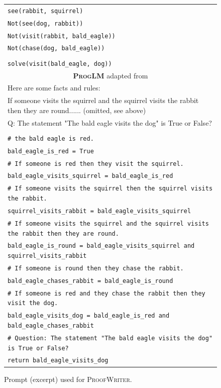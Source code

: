\documentclass{article}
\theoremstyle{definition}
\newcommand{\proofwriter}{\textsc{ProofWriter}}
\newcommand{\pallm}{\textsc{ProgLM}}
\begin{document}
\begin{figure}[h]
\begin{tabularx}{\linewidth}{X}
    \tt see(rabbit, squirrel) \\
    \tt Not(see(dog, rabbit)) \\
    \tt Not(visit(rabbit, bald\_eagle)) \\
    \tt Not(chase(dog, bald\_eagle))\\
\\
    \tt solve(visit(bald\_eagle, dog)) \\
    \midrule
    \multicolumn{1}{c}{\textbf{\pallm{}} adapted from \cite{creswell2023selectioninference}} \\
    \midrule
             Here are some facts and rules:\\
If someone visits the squirrel and the squirrel visits the rabbit then they are round...... (omitted, see above) \\
Q: The statement "The bald eagle visits the dog" is True or False? \\
\\
    \tt \# the bald eagle is red. \\
    \tt bald\_eagle\_is\_red = True \\
    \tt \# If someone is red then they visit the squirrel. \\
    \tt bald\_eagle\_visits\_squirrel = bald\_eagle\_is\_red \\
    \tt \# If someone visits the squirrel then the squirrel visits the rabbit. \\
    \tt squirrel\_visits\_rabbit = bald\_eagle\_visits\_squirrel \\
    \tt \# If someone visits the squirrel and the squirrel visits the rabbit then they are round. \\
    \tt bald\_eagle\_is\_round = bald\_eagle\_visits\_squirrel and squirrel\_visits\_rabbit \\
    \tt \# If someone is round then they chase the rabbit. \\
    \tt bald\_eagle\_chases\_rabbit = bald\_eagle\_is\_round \\
    \tt \# If someone is red and they chase the rabbit then they \tt visit the dog. \\
    \tt bald\_eagle\_visits\_dog = bald\_eagle\_is\_red and \tt bald\_eagle\_chases\_rabbit \\
    \tt \# Question: The statement "The bald eagle visits the dog" is True or False? \\
    \tt return bald\_eagle\_visits\_dog \\
    
    \bottomrule
    \end{tabularx}
    \caption{Prompt (excerpt) used for \proofwriter{}. }
\end{figure}
\end{document}
